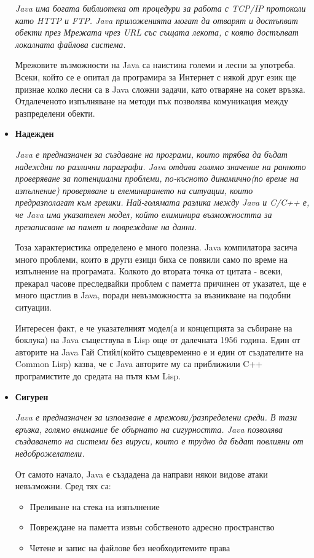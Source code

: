 \begin{itemize}
    \emph{Java има богата библиотека от процедури за работа с TCP/IP
    протоколи като HTTP и FTP. Java приложенията могат да отварят и
    достъпват обекти през Мрежата чрез URL със същата лекота, с която
    достъпват локалната файлова система.}

    Мрежовите възможности на Java са наистина големи и лесни за
    употреба. Всеки, който се е опитал да програмира за Интернет с някой
    друг език ще признае колко лесни са в Java сложни задачи, като
    отваряне на сокет връзка. Отдалеченото изпълняване на методи пък
    позволява комуникация между разпределени обекти.

  \item \textbf{Надежден}

    \emph{Java е предназначен за създаване на програми, които трябва да
    бъдат надеждни по различни параграфи. Java отдава голямо значение
    на ранното проверяване за потенциални проблеми, по-късното
    динамично(по време на изпълнение) проверяване и елеминирането на
    ситуации, които предразполагат към грешки. Най-голямата разлика
    между Java и C/C++ е, че Java има указателен модел, който
    елиминира възможността за презаписване на памет и повреждане на
    данни.}

  Тоза характеристика определено е много полезна. Java компилатора
  засича много проблеми, които в други езици биха се появили само по
  време на изпълнение на програмата. Колкото до втората точка от
  цитата - всеки, прекарал часове преследвайки проблем с паметта
  причинен от указател, ще е много щастлив в Java, поради
  невъзможността за възникване на подобни ситуации. 

  Интересен факт, е че указателният модел(а и концепцията за събиране
  на боклука) на Java съществува в Lisp още от далечната 1956
  година. Един от авторите на Java Гай Стийл(който същевременно е и
  един от създателите на Common Lisp) казва, че с Java авторите му са
  приближили C++ програмистите до средата на пътя към Lisp.

\item \textbf{Сигурен} 

  \emph{Java е предназначен за използване в мрежови/разпределени среди. В
  тази връзка, голямо внимание бе обърнато на сигурността. Java
  позволява създаването на системи без вируси, които е трудно да бъдат
  повлияни от недоброжелатели.}

От самото начало, Java е създадена да направи някои видове атаки
невъзможни. Сред тях са:

\begin{itemize}
\item Преливане на стека на изпълнение
\item Повреждане на паметта извън собственото адресно пространство
\item Четене и запис на файлове без необходитемите права
\end{itemize} 


\end{itemize}
